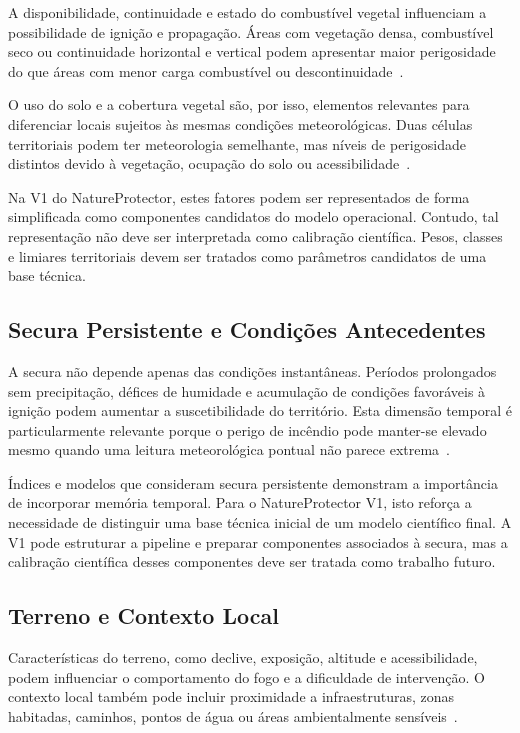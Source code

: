 A disponibilidade, continuidade e estado do combustível vegetal influenciam a possibilidade de ignição e propagação. Áreas com vegetação densa, combustível seco ou continuidade horizontal e vertical podem apresentar maior perigosidade do que áreas com menor carga combustível ou descontinuidade~\citep{nrcan_fwi_system,clms_corine_land_cover}.

O uso do solo e a cobertura vegetal são, por isso, elementos relevantes para diferenciar locais sujeitos às mesmas condições meteorológicas. Duas células territoriais podem ter meteorologia semelhante, mas níveis de perigosidade distintos devido à vegetação, ocupação do solo ou acessibilidade~\citep{clms_corine_land_cover,dgt_cos}.

Na V1 do NatureProtector, estes fatores podem ser representados de forma simplificada como componentes candidatos do modelo operacional. Contudo, tal representação não deve ser interpretada como calibração científica. Pesos, classes e limiares territoriais devem ser tratados como parâmetros candidatos de uma base técnica.

\subsection{Secura Persistente e Condições Antecedentes}

A secura não depende apenas das condições instantâneas. Períodos prolongados sem precipitação, défices de humidade e acumulação de condições favoráveis à ignição podem aumentar a suscetibilidade do território. Esta dimensão temporal é particularmente relevante porque o perigo de incêndio pode manter-se elevado mesmo quando uma leitura meteorológica pontual não parece extrema~\citep{keetch_byram_1968,nrcan_fwi_system}.

Índices e modelos que consideram secura persistente demonstram a importância de incorporar memória temporal. Para o NatureProtector V1, isto reforça a necessidade de distinguir uma base técnica inicial de um modelo científico final. A V1 pode estruturar a pipeline e preparar componentes associados à secura, mas a calibração científica desses componentes deve ser tratada como trabalho futuro.

\subsection{Terreno e Contexto Local}

Características do terreno, como declive, exposição, altitude e acessibilidade, podem influenciar o comportamento do fogo e a dificuldade de intervenção. O contexto local também pode incluir proximidade a infraestruturas, zonas habitadas, caminhos, pontos de água ou áreas ambientalmente sensíveis~\citep{clms_corine_land_cover,dgt_cos}.

